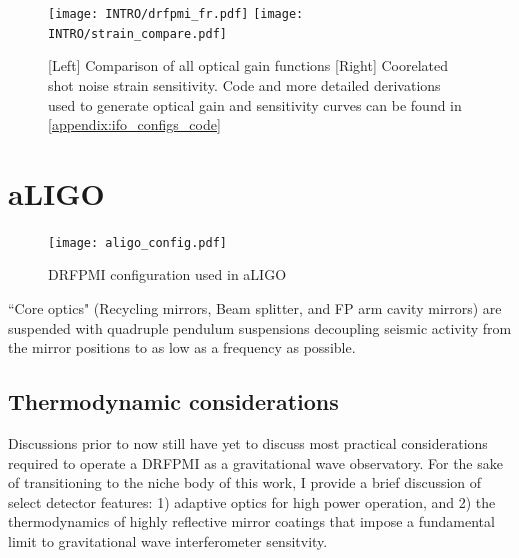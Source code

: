 \begin{figure}[h!]
  \begin{subcaptiongroup}
	  \texttt{[image: INTRO/drfpmi\_fr.pdf]}
 	  \texttt{[image: INTRO/strain\_compare.pdf]}
  \end{subcaptiongroup}
  \hfill
  \caption{[Left] Comparison of all optical gain functions [Right] Coorelated shot noise strain sensitivity. Code and more detailed derivations used to generate optical gain and sensitivity curves can be found in \autoref{appendix:ifo_configs_code}}
  \label{fig:drfpmi_gain_and_strain}
\end{figure}

\section{aLIGO}

\begin{figure}[H]
  \begin{center}
	  \texttt{[image: aligo\_config.pdf]}
  \end{center}
  \caption{DRFPMI configuration used in aLIGO~\cite{aasi:2015}}
  \label{fig:simple_michelson}
\end{figure}

``Core optics" (Recycling mirrors, Beam splitter, and FP arm cavity mirrors) are suspended with quadruple pendulum suspensions decoupling seismic activity from the mirror positions to as low as a frequency as possible. 

\subsection{Thermodynamic considerations}
Discussions prior to now still have yet to discuss most practical considerations required to operate a DRFPMI as a gravitational wave observatory. For the sake of transitioning to the niche body of this work, I provide a brief discussion of select detector features: 1) adaptive optics for high power operation, and 2) the thermodynamics of highly reflective mirror coatings that impose a fundamental limit to gravitational wave interferometer sensitvity. 


